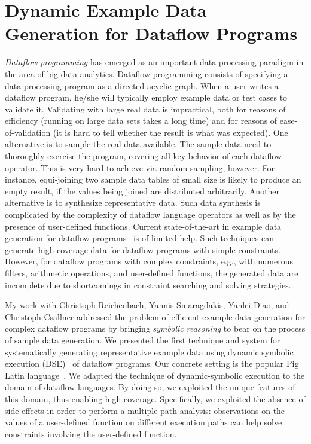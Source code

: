 \documentclass[proposal]{umthesis} %
\begin{document}
\section{Dynamic Example Data Generation for Dataflow Programs}

\emph{Dataflow programming} has emerged as an important data
processing paradigm in the area of big data analytics. Dataflow
programming consists of specifying a data processing program as a
directed acyclic graph. 
When a user writes a dataflow program, he/she will typically employ
example data or test cases to validate it. Validating with large real
data is impractical, both for reasons of efficiency (running on large
data sets takes a long time) and for reasons of ease-of-validation (it
is hard to tell whether the result is what was expected). One
alternative is to sample the real data available. The sample data need
to thoroughly exercise the program, covering all key behavior of each
dataflow operator. This is very hard to achieve via random sampling,
however. For instance, equi-joining two sample data tables of small
size is likely to produce an empty result, if the values being joined
are distributed arbitrarily.
Another alternative is to synthesize representative data.  Such data
synthesis is complicated by the complexity of dataflow language
operators as well as by the presence of user-defined functions.
Current state-of-the-art in example data generation for dataflow
programs~\cite{Olston:2009:GED:1559845.1559873} is of limited
help. Such techniques can generate high-coverage data for dataflow
programs with simple constraints. However, for dataflow programs with
complex constraints, e.g., with numerous filters, arithmetic
operations, and user-defined functions, the generated data are
incomplete due to shortcomings in constraint searching and solving
strategies.

My work \cite{6693083} with Christoph Reichenbach, Yannis Smaragdakis, Yanlei Diao, and Christoph Csallner addressed the problem of efficient example data
generation for complex dataflow programs by bringing {\em
  symbolic reasoning} to bear on the process of sample data
generation.  We presented the first technique and system for
systematically generating representative example data using dynamic
symbolic execution (DSE)~\cite{godefroid05dart,cadar05execution,tillmann:08} of dataflow programs.  Our
concrete setting is the popular Pig Latin
language~\cite{Olston:2008:PLN:1376616.1376726}.  We adapted the technique of dynamic-symbolic execution to the domain of dataflow languages. By doing so, we exploited the unique features of this domain, thus enabling high coverage. Specifically,
  we exploited the absence of side-effects in order to perform a
  multiple-path analysis: observations on the values of a user-defined
  function on different execution paths can help solve constraints
  involving the user-defined function.
\end{document}
